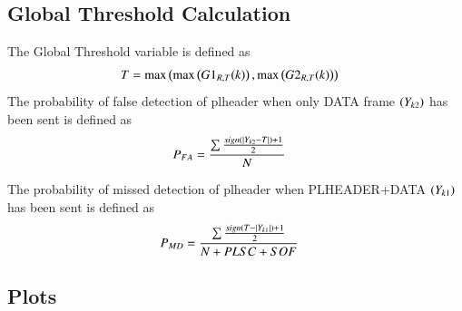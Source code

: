 \documentclass[journal,12pt,twocolumn]{IEEEtran}
\begin{document}
\subsection{Global Threshold Calculation}
The Global Threshold variable is defined as
\begin{align}
T&= \max \left( \max \left(G1_{R,T}(k)\right),\max \left( G2_{R,T}(k)\right)\right)
\end{align} 
The probability of false detection of plheader when only DATA frame $\left(Y_{k2}\right)$ has been sent is defined as
\begin{align}
P_{FA} &= \frac{\sum \frac{sign(\left\vert Y_{k2}-T\right\vert)+1}{2} }{N}
\end{align}

The probability of missed detection of plheader when PLHEADER+DATA $\left(Y_{k1}\right)$ has been sent is defined as
\begin{align}
P_{MD} &= \frac{\sum \frac{sign(T-\left\vert Y_{k1}\right\vert)+1}{2} }{N+PLSC+SOF}
\end{align}

\subsection{Plots}
\end{document}
